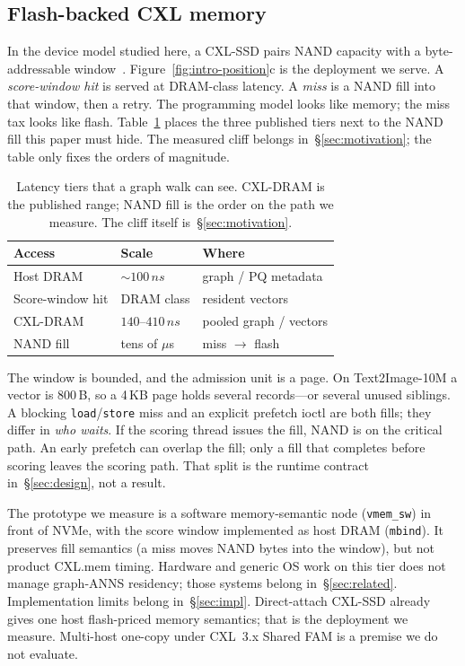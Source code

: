\subsection{Flash-backed CXL memory}
\label{sec:bg-cxl-ssd}

In the device model studied here, a CXL-SSD pairs NAND capacity with a
byte-addressable window~\cite{cxlssd,skybyte,fromblocktobyte,hellobytes,cmmh}.
Figure~\ref{fig:intro-position}c is the deployment we serve. A
\emph{score-window hit} is served at DRAM-class latency. A \emph{miss} is a NAND
fill into that window, then a retry. The programming model looks like
memory; the miss tax looks like flash. Table~\ref{tab:bg-latency}
places the three published tiers next to the NAND fill this paper
must hide. The measured cliff belongs in~\S\ref{sec:motivation}; the
table only fixes the orders of magnitude.

\begin{table}[t]
  \caption{Latency tiers that a graph walk can see.
    CXL-DRAM is the published range; NAND fill is the order on the
    path we measure. The cliff itself is~\S\ref{sec:motivation}.}
  \label{tab:bg-latency}
  \small
  \begin{tabular}{@{}p{}p{}p{}@{}}
    \toprule
    Access & Scale & Where \\
    \midrule
    Host DRAM & $\sim100\,ns$ & graph / PQ metadata \\
    Score-window hit & DRAM class & resident vectors \\
    CXL-DRAM & $140$--$410\,ns$ & pooled graph / vectors \\
    NAND fill & tens of $\mu$s & miss $\rightarrow$ flash \\
    \bottomrule
  \end{tabular}
\end{table}

The window is bounded, and the admission unit is a page. On
Text2Image-10M a vector is 800\,B, so a 4\,KB page holds several
records---or several unused siblings. A blocking
\texttt{load}/\texttt{store} miss and an explicit prefetch ioctl are
both fills; they differ in \emph{who waits}. If the scoring thread
issues the fill, NAND is on the critical path. An early prefetch can
overlap the fill; only a fill that completes before scoring leaves the
scoring path. That split is
the runtime contract in~\S\ref{sec:design}, not a result.

The prototype we measure is a software memory-semantic node
(\texttt{vmem\_sw}) in front of NVMe, with the score window implemented
as host DRAM (\texttt{mbind}). It preserves fill semantics (a miss
moves NAND bytes into the window), but not product CXL.mem timing. Hardware and generic
OS work on this tier does not manage graph-ANNS residency; those
systems belong in~\S\ref{sec:related}. Implementation limits belong
in~\S\ref{sec:impl}.
Direct-attach CXL-SSD already gives one host flash-priced memory
semantics; that is the deployment we measure. Multi-host one-copy
under CXL~3.x Shared FAM is a premise we do not evaluate.
